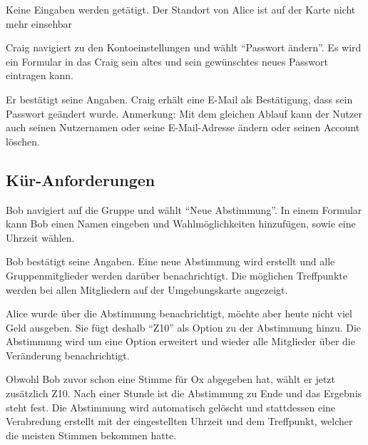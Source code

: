 \documentclass[parskip=full,11pt]{scrartcl}
\begin{document}
{Keine Eingaben werden getätigt.}
{Der Standort von Alice ist auf der Karte nicht mehr einsehbar}


{Craig navigiert zu den Kontoeinstellungen und wählt \enquote{Passwort ändern}.}
{Es wird ein Formular in das Craig sein altes und sein gewünschtes neues Passwort eintragen kann.}

{Er bestätigt seine Angaben.}
{Craig erhält eine E-Mail als Bestätigung, dass sein Passwort geändert wurde.}
Anmerkung: Mit dem gleichen Ablauf kann der Nutzer auch seinen Nutzernamen oder seine
E-Mail-Adresse ändern oder seinen Account löschen.


\subsection{Kür-Anforderungen}
{Bob navigiert auf die Gruppe und wählt \enquote{Neue Abstimmung}.}
{In einem Formular kann Bob einen Namen eingeben und Wahlmöglichkeiten hinzufügen,
	sowie eine Uhrzeit wählen.}

{Bob bestätigt seine Angaben.}
{Eine neue Abstimmung wird erstellt und alle Gruppenmitglieder werden darüber benachrichtigt.
Die möglichen Treffpunkte werden bei allen Mitgliedern auf der Umgebungskarte angezeigt.}

{Alice wurde über die Abstimmung benachrichtigt, möchte aber heute nicht viel Geld ausgeben.
Sie fügt deshalb \enquote{Z10} als Option zu der Abstimmung hinzu.}
{Die Abstimmung wird um eine Option erweitert und 
wieder alle Mitglieder über die Veränderung benachrichtigt.}

{Obwohl Bob zuvor schon eine Stimme für Ox abgegeben hat, wählt er jetzt zusätzlich Z10.}
{Nach einer Stunde ist die Abstimmung zu Ende und das Ergebnis steht fest.
Die Abstimmung wird automatisch gelöscht und stattdessen eine Verabredung erstellt mit der 
eingestellten Uhrzeit und dem Treffpunkt, welcher die meisten Stimmen bekommen hatte.}
\end{document}
